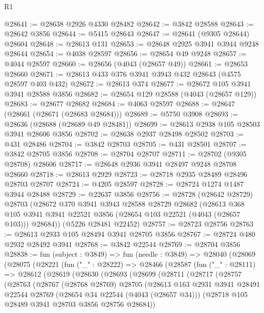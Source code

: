 \begin{lexlean}{R1}
\begin{coremodule}
@28641 := @28638 @2926 @4330 @28482
@28642 := @3842 @28588
@28643 := @28642 @3856
@28644 := @5415 @28643
@28647 := @28641 (@9305 @28644) @28604
@28648 := @28613 @131
@28653 := @28648 @2925 @3941 @3944 @9248 @28644
@28654 := @4038 @28597
@28656 := @28654 @49 @9248
@28657 := @4044 @28597
@28660 := @28656 (@4043 (@28657 @49))
@28661 := @28653 @28660
@28671 := @28613 @433 @376 @3941 @3943 @432 @28643 (@4575 @28597 @403 @432)
@28672 := @28613 @374
@28677 := @28672 @105 @3941 @3941 @28588 @3856
@28682 := @28654 @129 @28588 (@4043 (@28657 @129))
@28683 := @28677 @28682
@28684 := @4063 @28597
@28688 := @28647 (@28661 (@28671 (@28683 @28684)))
@28689 := @5750 @3908
@28693 := @28636 (@28688 (@28689 @49 @28481))
@28699 := @28613 @2938 @105 @28503 @3941 @28606 @3856
@28702 := @28638 @2937 @28498 @28502
@28703 := @431 @28486
@28704 := @3842 @28703
@28705 := @431 @28501
@28707 := @3842 @28705 @3856
@28708 := @28704 @28707
@28711 := @28702 (@9305 @28708) @28606
@28717 := @28648 @2936 @3941 @28497 @9248 @28708 @28660
@28718 := @28613 @2929
@28723 := @28718 @2935 @28489 @28496 @28703 @28707
@28724 := @4205 @28597
@28728 := @28724 @1274 @1487 @3944 @28488
@28729 := @22637 @3856
@28756 := @28728
    (@28642 @28729)
    @28703
    (@28672
      @370
      @3941
      @3943
      @28588
      @28729
      @28682
      (@28613 @368 @105 @3941 @3941 @22521 @3856 (@28654 @103 @22521 (@4043 (@28657 @103))) @28684))
    (@5226 @28481 @22452)
@28757 := @28723 @28756
@28763 := @28613 @2933 @105 @28494 @3941 @28705 @3856
@28767 := @28724 @480 @2932 @28492 @3941
@28768 := @3842 @22544
@28769 := @28704 @3856
@28838 := fun (subject : @3849) =>
  fun (needle : @3849) =>
  @28040
    (@28069
      (@28075
        (@28221
          (fun ("_" : @28222) =>
          @28466
            (@28587
              (fun ("_" : @28111) =>
              @28612
                (@28619
                  (@28630
                    (@28693
                      (@28699
                        (@28711
                          (@28717
                            (@28757
                              (@28763
                                (@28767
                                  (@28768 @28769)
                                  @28705
                                  (@28613
                                    @163
                                    @2931
                                    @3941
                                    @28491
                                    @22544
                                    @28769
                                    (@28654 @34 @22544 (@4043 (@28657 @34)))
                                    (@28718 @105 @28489 @3941 @28703 @3856 @28756 @28684))

\end{coremodule}
\end{lexlean}
